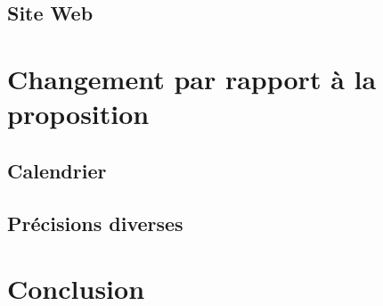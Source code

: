 \documentclass{article}
\begin{document}
\subsection{Site Web}

\section{Changement par rapport à la proposition}

\subsection{Calendrier}

\subsection{Précisions diverses}

\section*{Conclusion}
\end{document}
